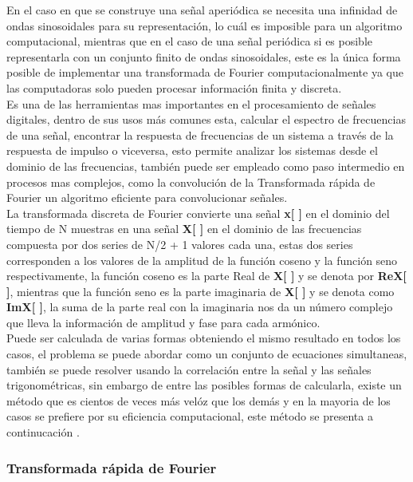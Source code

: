 En el caso en que se construye una señal aperi\'odica se necesita una infinidad de ondas sinosoidales para su representaci\'on, lo cu\'al es imposible para un algoritmo computacional, mientras que en el caso de una señal peri\'odica si es posible representarla con un conjunto finito de ondas sinosoidales, este es la \'unica forma posible de implementar una transformada de Fourier computacionalmente ya que las computadoras solo pueden procesar informaci\'on finita y discreta.\\ 

Es una de las herramientas mas importantes en el procesamiento de señales digitales, dentro de sus usos m\'as comunes esta, calcular el espectro de frecuencias de una señal, encontrar la respuesta de frecuencias de un sistema a trav\'es de la respuesta de impulso o viceversa, esto permite analizar los sistemas desde el dominio de las frecuencias, tambi\'en puede ser empleado como paso intermedio en procesos mas complejos, como la convoluci\'on de la Transformada r\'apida de Fourier un algoritmo eficiente para convolucionar señales.\\

La transformada discreta de Fourier convierte una señal \textbf{x[ ]} en el dominio del tiempo de N muestras en una señal \textbf{X[ ]} en el dominio de las frecuencias compuesta por dos series de N/2 + 1 valores cada una, estas dos series corresponden a los valores de la amplitud de la funci\'on coseno y la funci\'on seno respectivamente, la funci\'on coseno es la parte Real de \textbf{X[ ]} y se denota por \textbf{ReX[ ]}, mientras que la funci\'on seno es la parte imaginaria de \textbf{X[ ]} y se denota como \textbf{ImX[ ]}, la suma de la parte real con la imaginaria nos da un n\'umero complejo que lleva la informaci\'on de amplitud y fase para cada arm\'onico.\\

Puede ser calculada de varias formas obteniendo el mismo resultado en todos los casos, el problema se puede abordar como un conjunto de ecuaciones simultaneas, tambi\'en se puede resolver usando la correlaci\'on entre la señal y las señales trigonom\'etricas, sin embargo de entre las posibles formas de calcularla, existe un m\'etodo que es cientos de veces m\'as vel\'oz que los dem\'as y en la mayoria de los casos se prefiere por su eficiencia computacional, este m\'etodo se presenta a continucaci\'on \cite{smith}.\\

\subsubsection{Transformada r\'apida de Fourier}

